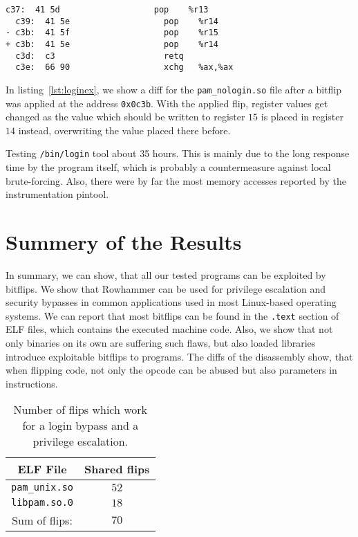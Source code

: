 \begin{minipage}{\linewidth}
\begin{lstlisting}[style=diff,
                   caption={Diff for a bitflip applied to the
\texttt{pam\_nologin.so} binary in order to bypass a credential check. The
pop to register $15$ gets exchanged with a pop to register $14$, therefore the
value of \texttt{r15} and \texttt{r14} are not as desired and hence the
execution path of \texttt{/bin/login} changes in a way the login
procedure succeeds.},
label=lst:loginex]
  c37:  41 5d                   pop    %r13
  c39:  41 5e                   pop    %r14
- c3b:  41 5f                   pop    %r15
+ c3b:  41 5e                   pop    %r14
  c3d:  c3                      retq
  c3e:  66 90                   xchg   %ax,%ax
\end{lstlisting}
\end{minipage}

In listing~\ref{lst:loginex}, we show a diff for the \texttt{pam\_nologin.so}
file after a bitflip was applied at the address \texttt{0x0c3b}. With
the applied flip, register values get changed as the value which should be
written to register $15$ is placed in register $14$ instead, overwriting the
value placed there before.

Testing \texttt{/bin/login} tool about 35 hours. This is mainly due to the long
response time by the program itself, which is probably a countermeasure against
local brute-forcing. Also, there were by far the most memory accesses reported
by the instrumentation pintool.

\section{Summery of the Results}

In summary, we can show, that all our tested programs can be exploited by
bitflips. We show that Rowhammer can be used for privilege escalation and
security bypasses in common applications used in most Linux-based operating
systems. We can report that most bitflips can be found in the \texttt{.text}
section of ELF files, which contains the executed machine code. Also, we show
that not only binaries on its own are suffering such flaws, but also loaded
libraries introduce exploitable bitflips to programs. The diffs of the
disassembly show, that when flipping code, not only the opcode can be abused but
also parameters in instructions.

\begin{table}[!htb]
\centering
\begin{tabular}{c|c}
ELF File               & Shared flips \\ \hline
\texttt{pam\_unix.so} & $52$ \\
\texttt{libpam.so.0} & $18$ \\ \hline
Sum of flips:                 & $70$
\end{tabular}
\caption{Number of flips which work for a login bypass and a 
privilege escalation.}
\label{tab:loginsudo}
\end{table}

